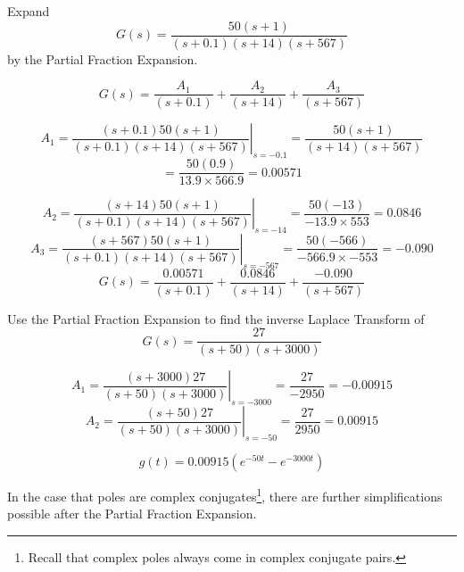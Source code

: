 \begin{ExampleSmall}
Expand
\[
G(s) = \frac         {50(s+1)}                      {(s+0.1)(s+14)(s+567)}
\]
by the Partial Fraction Expansion.

\vspace{0.2in}
\[
G(s) = \frac{A_1}{(s+0.1)} + \frac{A_2}{(s+14)} + \frac{A_3}{(s+567)}
\]

\[
A_1 = \left . \frac {(s+0.1)50(s+1)}{(s+0.1)(s+14)(s+567)} \right |_{s=-0.1} =  \frac {50(s+1)}  {(s+14)(s+567)}
\]
\[
= \frac {50(0.9)}{13.9\times566.9} = 0.00571
\]

\[
A_2 = \left . \frac {(s+14)50(s+1)}{(s+0.1)(s+14)(s+567)} \right |_{s=-14} = \frac {50(-13)}{-13.9 \times 553} = 0.0846
\]
\[
A_3 = \left . \frac {(s+567)50(s+1)}{(s+0.1)(s+14)(s+567)} \right |_{s=-567} = \frac {50(-566)}{-566.9 \times -553} = -0.090
\]
\vspace{0.15in}
\[
G(s) = \frac{0.00571}{(s+0.1)} + \frac{0.0846}{(s+14)} + \frac{-0.090}{(s+567)}
\]
\end{ExampleSmall}

\begin{ExampleSmall}
Use the Partial Fraction Expansion to find the inverse Laplace Transform of
\[
G(s) =  \frac          {27}             {(s+50)(s+3000)}
\]


\[
A_1 = \left . \frac {(s+3000)27}{(s+50)(s+3000)} \right |_{s=-3000} = \frac {27}{-2950} = -0.00915
\]
\[
A_2 = \left . \frac {(s+50)27}{(s+50)(s+3000)} \right |_{s=-50} = \frac {27}{2950} = 0.00915
\]

\[
g(t) = 0.00915(e^{-50t}-e^{-3000t})
\]

\end{ExampleSmall}


In the case that poles are complex conjugates\footnote{Recall that complex poles always come in complex conjugate pairs.}, there are further simplifications possible after the Partial Fraction Expansion.

